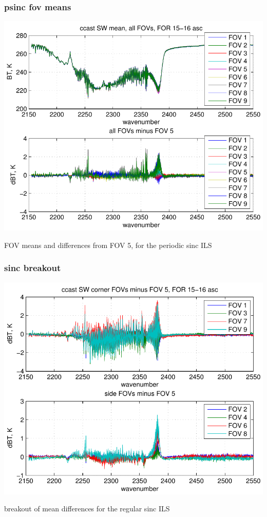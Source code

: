 \documentclass[11pt]{beamer}
\begin{document}
\begin{frame}
\frametitle{psinc fov means}

\begin{center}
  \includegraphics[scale=0.6]{figures/hr2_avg_p.pdf}
\end{center}

FOV means and differences from FOV 5, for the periodic sinc ILS

\end{frame}
\begin{frame}
\frametitle{sinc breakout}

\begin{center}
  \includegraphics[scale=0.6]{figures/hr2_dif_s.pdf}
\end{center}

breakout of mean differences for the regular sinc ILS

\end{frame}
\end{document}

